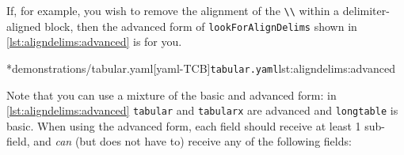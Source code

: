         \begin{cmhtcbraster}
        \end{cmhtcbraster}

	If, for example, you wish to remove the alignment of the \lstinline!\\! within a
	delimiter-aligned block, then the advanced form of \texttt{lookForAlignDelims} shown in
	\cref{lst:aligndelims:advanced} is for you.

	\cmhlistingsfromfile[style=yaml-LST]*{demonstrations/tabular.yaml}[yaml-TCB]{\texttt{tabular.yaml}}{lst:aligndelims:advanced}

	Note that you can use a mixture of the basic and advanced form: in
	\cref{lst:aligndelims:advanced} \texttt{tabular} and \texttt{tabularx} are advanced
	and \texttt{longtable} is basic. When using the advanced form, each field should
	receive at least 1 sub-field, and \emph{can}
	(but does not have to) receive any of the following
	fields:
